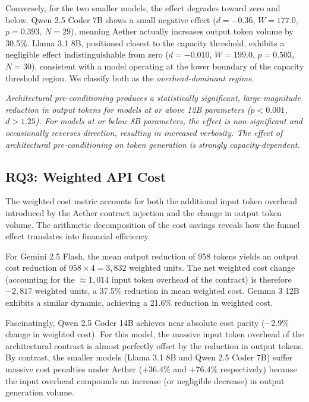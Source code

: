 \documentclass[review,12pt,3p]{elsarticle}
\begin{document}
Conversely, for the two smaller models, the effect degrades toward zero and below.
Qwen 2.5 Coder 7B shows a small negative effect ($d = -0.36$, $W=177.0$, $p=0.393$,
$N=29$), meaning Aether actually increases output token volume by 30.5\%. Llama 3.1 8B,
positioned closest to the capacity threshold, exhibits a negligible effect indistinguishable
from zero ($d = -0.010$, $W=199.0$, $p=0.503$, $N=30$), consistent with a model
operating at the lower boundary of the capacity threshold region. We classify both as
the \emph{overhead-dominant regime}.


\begin{tcolorbox}[
  colback=gray!10,
  colframe=black!60,
  title=\textbf{RQ2 Summary},
  fonttitle=\bfseries,
  breakable
]
\textit{Architectural pre-conditioning produces a statistically significant, large-magnitude
reduction in output tokens for models at or above 12B parameters ($p < 0.001$, $d > 1.25$). 
For models at or below 8B parameters, the effect is non-significant and occasionally reverses 
direction, resulting in increased verbosity. The effect of architectural pre-conditioning on 
token generation is strongly capacity-dependent.}
\end{tcolorbox}

\subsection{RQ3: Weighted API Cost}

The weighted cost metric accounts for both the additional input token
overhead introduced by the Aether contract injection and the change in output token volume.
The arithmetic decomposition of the cost savings reveals how the funnel effect translates
into financial efficiency.

For Gemini 2.5 Flash, the mean output reduction of 958 tokens yields an output
cost reduction of $958 \times 4 = 3{,}832$ weighted units. The net weighted cost change
(accounting for the $\approx 1{,}014$ input token overhead of the contract) is therefore 
$-2{,}817$ weighted units, a 37.5\% reduction in mean weighted cost. Gemma 3 12B exhibits 
a similar dynamic, achieving a 21.6\% reduction in weighted cost.

Fascinatingly, Qwen 2.5 Coder 14B achieves near absolute cost parity ($-2.9\%$ change in weighted cost). 
For this model, the massive input token overhead of the architectural contract is almost perfectly 
offset by the reduction in output tokens. By contrast, the smaller models (Llama 3.1 8B and Qwen 2.5 Coder 7B) 
suffer massive cost penalties under Aether ($+36.4\%$ and $+76.4\%$ respectively) because the input 
overhead compounds an increase (or negligible decrease) in output generation volume.
\end{document}
